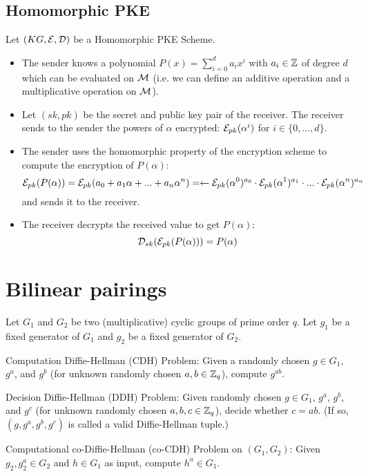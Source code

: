 \subsection{Homomorphic PKE}
Let $(KG,\mathcal{E},\mathcal{D})$ be a Homomorphic PKE Scheme.
\begin{itemize}[align = left, leftmargin=*, label={--}]
\item The sender knows a polynomial $P(x) = \sum_{i=0}^d a_i x^i$ with $a_i \in {\mathbb Z}$ of degree $d$ which can be evaluated on $\mathcal{M}$ (i.e. we can define an additive operation and a multiplicative operation on $\mathcal{M}$). 

\item Let $(sk,pk)$ be the secret and public key pair of the receiver. The receiver sends to the sender the powers of $\alpha$ encrypted: $\mathcal{E}_{pk}(\alpha^i)$ for $i \in \{0, ..., d\}$.

\item The sender uses the homomorphic property of the encryption scheme to compute the encryption of $P(\alpha)$: $$\mathcal{E}_{pk}(P(\alpha)) = \mathcal{E}_{pk}(a_0 + a_1 \alpha + ... + a_n \alpha^n) = \leftarrow \mathcal{E}_{pk}(\alpha^0)^{a_0} \cdot \mathcal{E}_{pk}(\alpha^1)^{a_1} \cdot ... \cdot \mathcal{E}_{pk}(\alpha^n)^{a_n}$$
and sends it to the receiver.

\item The receiver decrypts the received value to get $P(\alpha)$:
$$\mathcal{D}_{sk}(\mathcal{E}_{pk}(P(\alpha))) = P(\alpha) $$

\end{itemize}

\section{Bilinear pairings}
\nocite{DiHe76}

Let $G_1$ and $G_2$ be two (multiplicative) cyclic groups of prime order $q$. Let $g_1$ be a fixed generator of $G_1$ and $g_2$ be a fixed generator of $G_2$.

 Computation Diffie-Hellman (CDH) Problem: Given a randomly chosen $g \in G_1$, $g^a$, and $g^b$ (for unknown randomly chosen $a,b \in {\mathbb Z}_q$), compute $g^{ab}$.

 Decision Diffie-Hellman (DDH) Problem: Given randomly chosen $g \in G_1$, $g^a$, $g^b$, and $g^c$ (for unknown randomly chosen $a,b,c \in {\mathbb Z}_q$), decide whether $c = ab$. (If so, $(g, g^a, g^b, g^c)$ is called a valid Diffie-Hellman tuple.)

 Computational co-Diffie-Hellman (co-CDH) Problem on $(G_1, G_2)$: Given $g_2, g^a_2 \in G_2$ and $h \in G_1$ as input, compute $h^a \in G_1$.

